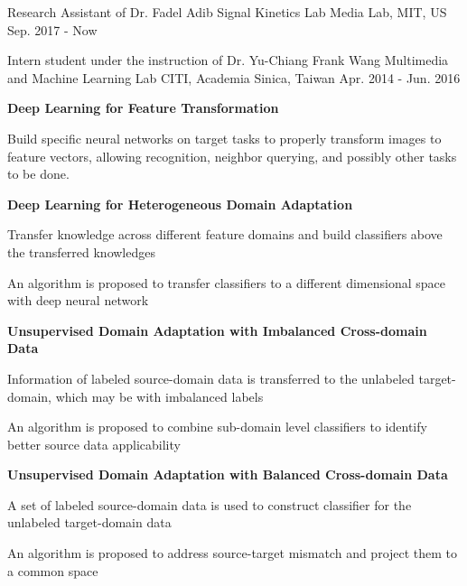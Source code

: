\documentclass[12pt, a4paper]{awesome-cv}
\begin{document}
\begin{cventries}
    \cventry
    {Research Assistant of Dr. Fadel Adib}
    {Signal Kinetics Lab}
    {Media Lab, MIT, US}
    {Sep. 2017 - Now}
    {}

    \cventry
    {Intern student under the instruction of Dr. Yu-Chiang Frank Wang}
    {Multimedia and Machine Learning Lab}
    {CITI, Academia Sinica, Taiwan}
    {Apr. 2014 - Jun. 2016}
    {
        \begin{cvitems}
        \item{\bfseries Deep Learning for Feature Transformation}
            \begin{cvitems}
            \item{Build specific neural networks on target tasks to properly transform images to feature vectors, allowing recognition, neighbor querying, and possibly other tasks to be done.}
            \end{cvitems}
        \item{\bfseries Deep Learning for Heterogeneous Domain Adaptation}
            \begin{cvitems}
            \item{Transfer knowledge across different feature domains and build classifiers above the transferred knowledges}
            \item{An algorithm is proposed to transfer classifiers to a different dimensional space with deep neural network}
            \end{cvitems}
        \item{\bfseries Unsupervised Domain Adaptation with Imbalanced Cross-domain Data}
            \begin{cvitems}
            \item{Information of labeled source-domain data is transferred to the unlabeled target-domain, which may be with imbalanced labels}
            \item{An algorithm is proposed to combine sub-domain level classifiers to identify better source data applicability}
            \end{cvitems}
        \item{\bfseries Unsupervised Domain Adaptation with Balanced Cross-domain Data}
            \begin{cvitems}
            \item{A set of labeled source-domain data is used to construct classifier for the unlabeled target-domain data}
            \item{An algorithm is proposed to address source-target mismatch and project them to a common space}

\end{cvitems}
\end{cvitems}}
\end{cventries}
\end{document}
